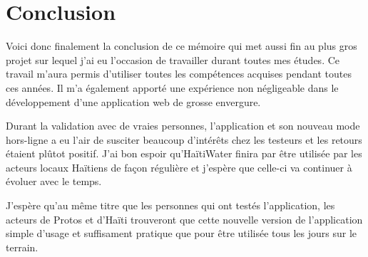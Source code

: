 \documentclass{EPL-master-thesis-covers-FR}
\begin{document}
			
	\chapter{Conclusion}
		Voici donc finalement la conclusion de ce mémoire qui met aussi fin au plus gros projet sur lequel j'ai eu l'occasion de travailler durant toutes mes études. Ce travail m'aura permis d'utiliser toutes les compétences acquises pendant toutes ces années. Il m'a également apporté une expérience non négligeable dans le développement d'une application web de grosse envergure.
		
		Durant la validation avec de vraies personnes, l'application et son nouveau mode hors-ligne a eu l'air de susciter beaucoup d'intérêts chez les testeurs et les retours étaient plûtot positif. J'ai bon espoir qu'HaïtiWater finira par être utilisée par les acteurs locaux Haïtiens de façon régulière et j'espère que celle-ci va continuer à évoluer avec le temps. 
		
		J'espère qu'au même titre que les personnes qui ont testés l'application, les acteurs de Protos et d'Haïti trouveront que cette nouvelle version de l'application simple d'usage et suffisament pratique que pour être utilisée tous les jours sur le terrain. 

		

	
	
		

	

	\setlength{\parskip}{0em}
	\backcoverpage
\end{document}
